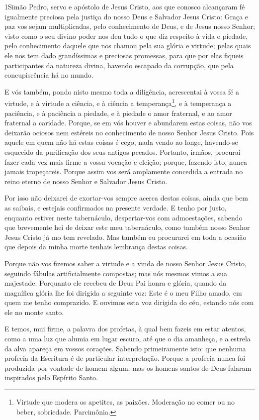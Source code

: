 
\lettrine{1} Simão Pedro, servo e apóstolo de Jesus Cristo,
aos que conosco alcançaram fé igualmente preciosa pela justiça do
nosso Deus e Salvador Jesus Cristo: Graça e paz vos sejam
multiplicadas, pelo conhecimento de Deus, e de Jesus nosso Senhor;
visto como o seu divino poder nos deu tudo o que diz respeito à
vida e piedade, pelo conhecimento daquele que nos chamou pela sua
glória e virtude; pelas quais ele nos tem dado grandíssimas e
preciosas promessas, para que por elas fiqueis participantes da
natureza divina, havendo escapado da corrupção, que pela
concupiscência há no mundo.

E vós também, pondo nisto mesmo toda a diligência, acrescentai à
vossa fé a virtude, e à virtude a ciência, e à ciência a
temperança\footnote{Virtude que modera os apetites, as paixões.
Moderação no comer ou no beber, sobriedade. Parcimônia.}, e à
temperança a paciência, e à paciência a piedade, e à piedade o
amor fraternal, e ao amor fraternal a caridade. Porque, se em
vós houver e abundarem estas coisas, não vos deixarão ociosos nem
estéreis no conhecimento de nosso Senhor Jesus Cristo. Pois
aquele em quem não há estas coisas é cego, nada vendo ao longe,
havendo-se esquecido da purificação dos seus antigos pecados.
Portanto, irmãos, procurai fazer cada vez mais firme a vossa
vocação e eleição; porque, fazendo isto, nunca jamais tropeçareis.
Porque assim vos será amplamente concedida a entrada no reino
eterno de nosso Senhor e Salvador Jesus Cristo.

Por isso não deixarei de exortar-vos sempre acerca destas coisas,
ainda que bem as saibais, e estejais confirmados na presente
verdade. E tenho por justo, enquanto estiver neste
tabernáculo, despertar-vos com admoestações, sabendo que
brevemente hei de deixar este meu tabernáculo, como também nosso
Senhor Jesus Cristo já mo tem revelado. Mas também eu
procurarei em toda a ocasião que depois da minha morte tenhais
lembrança destas coisas.

Porque não vos fizemos saber a virtude e a vinda de nosso Senhor
Jesus Cristo, seguindo fábulas artificialmente compostas; mas nós
mesmos vimos a sua majestade. Porquanto ele recebeu de Deus
Pai honra e glória, quando da magnífica glória lhe foi dirigida a
seguinte voz: Este é o meu Filho amado, em quem me tenho comprazido.
E ouvimos esta voz dirigida do céu, estando nós com ele no
monte santo.

E temos, mui firme, a palavra dos profetas, à qual bem fazeis em
estar atentos, como a uma luz que alumia em lugar escuro, até que o
dia amanheça, e a estrela da alva apareça em vossos corações.
Sabendo primeiramente isto: que nenhuma profecia da Escritura
é de particular interpretação. Porque a profecia nunca foi
produzida por vontade de homem algum, mas os homens santos de Deus
falaram inspirados pelo Espírito Santo.

